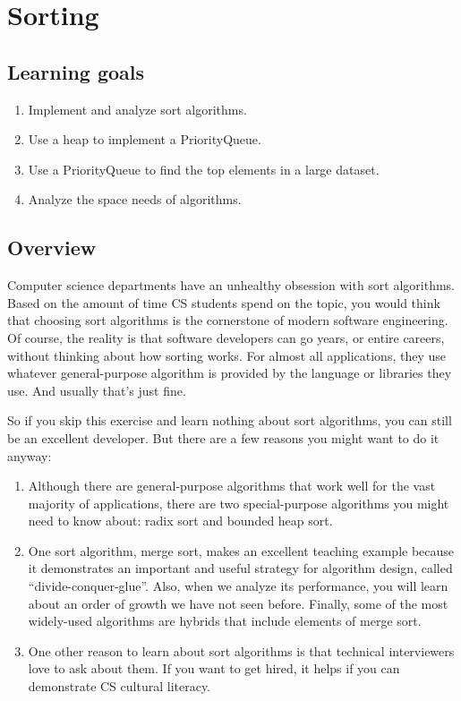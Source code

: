 \documentclass[12pt]{book}
\theoremstyle{exercise}
\begin{document}
\chapter{Sorting}

\section{Learning goals}\label{learning-goals-11}

\begin{enumerate}
\def\labelenumi{\arabic{enumi}.}
\itemsep1pt\parskip0pt
\item
  Implement and analyze sort algorithms.
\item
  Use a heap to implement a PriorityQueue.
\item
  Use a PriorityQueue to find the top elements in a large dataset.
\item
  Analyze the space needs of algorithms.
\end{enumerate}

\section{Overview}\label{overview-19}

Computer science departments have an unhealthy obsession with sort
algorithms. Based on the amount of time CS students spend on the topic,
you would think that choosing sort algorithms is the cornerstone of
modern software engineering. Of course, the reality is that software
developers can go years, or entire careers, without thinking about how
sorting works. For almost all applications, they use whatever
general-purpose algorithm is provided by the language or libraries they
use. And usually that's just fine.

So if you skip this exercise and learn nothing about sort algorithms, you can
still be an excellent developer. But there are a few reasons you might
want to do it anyway:

\begin{enumerate}
\def\labelenumi{\arabic{enumi}.}
\item
  Although there are general-purpose algorithms that work well for the
  vast majority of applications, there are two special-purpose
  algorithms you might need to know about: radix sort and bounded heap
  sort.
\item
  One sort algorithm, merge sort, makes an excellent teaching example
  because it demonstrates an important and useful strategy for algorithm
  design, called ``divide-conquer-glue''. Also, when we analyze its
  performance, you will learn about an order of growth we have not seen
  before. Finally, some of the most widely-used algorithms are hybrids
  that include elements of merge sort.
\item
  One other reason to learn about sort algorithms is that technical
  interviewers love to ask about them. If you want to get hired, it
  helps if you can demonstrate CS cultural literacy.
\end{enumerate}
\end{document}

